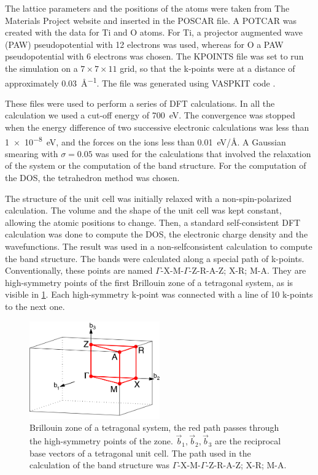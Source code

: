 The lattice parameters and the positions of the atoms were taken from The Materials Project website \cite{Jain2013} and inserted in the  POSCAR file. A POTCAR was created with the data for Ti and O atoms. For Ti, a projector augmented wave (PAW) pseudopotential with 12 electrons was used, whereas for O a PAW pseudopotential with 6 electrons was chosen. The KPOINTS file was set to run the simulation on a $7\times7\times11$ grid, so that the k-points were at a distance of approximately \SI{0.03}{\angstrom^{-1}}. The file was generated using VASPKIT code \cite{VASPKIT}.

These files were used to perform a series of DFT calculations. In all the calculation we used a cut-off energy of \SI{700}{eV}. The convergence was stopped when the energy difference of two successive electronic calculations was less than \SI{1e-8}{eV}, and the forces on the ions less than \SI{0.01}{eV/\angstrom}. A Gaussian smearing with $\sigma = 0.05$ was used for the calculations that involved the relaxation of the system or the computation of the band structure. For the computation of the DOS, the tetrahedron method was chosen.

The structure of the unit cell was initially relaxed with a non-spin-polarized calculation. The volume and the shape of the unit cell was kept constant, allowing the atomic positions to change. Then, a standard self-consistent DFT calculation was done to compute the DOS, the electronic charge density and the wavefunctions. The result was used in a non-selfconsistent calculation to compute the band structure. The bands were calculated along a special path of k-points. Conventionally, these points are named $\Gamma$-X-M-$\Gamma$-Z-R-A-Z; X-R; M-A. They are high-symmetry points of the first Brillouin zone of a tetragonal system, as is visible in \cref{fig:symmetry_points}. Each high-symmetry k-point was connected with a line of 10 k-points to the next one.


\begin{figure}
    \centering
    \includegraphics[width=0.5\textwidth]{figures/brillouin_zone}
    \caption{Brillouin zone of a tetragonal system, the red path passes through the high-symmetry points of the zone. $\vec{b}_1, \vec{b}_2, \vec{b}_3$ are the reciprocal base vectors of a tetragonal unit cell. The path used in the calculation of the band structure was $\Gamma$-X-M-$\Gamma$-Z-R-A-Z; X-R; M-A.}
    \label{fig:symmetry_points}
\end{figure}


